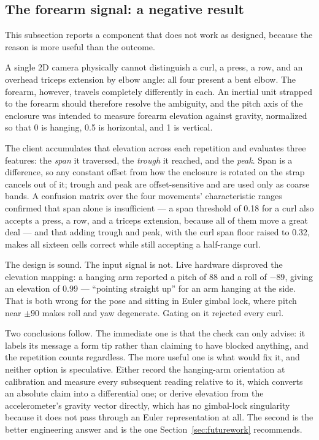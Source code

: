 \documentclass[11pt,a4paper]{article}
\begin{document}
\subsection{The forearm signal: a negative result}
\label{sec:forearm}

This subsection reports a component that does not work as designed, because the
reason is more useful than the outcome.

A single 2D camera physically cannot distinguish a curl, a press, a row, and an
overhead triceps extension by elbow angle: all four present a bent elbow. The
forearm, however, travels completely differently in each. An inertial unit
strapped to the forearm should therefore resolve the ambiguity, and the pitch
axis of the enclosure was intended to measure forearm elevation against gravity,
normalized so that 0 is hanging, 0.5 is horizontal, and 1 is vertical.

The client accumulates that elevation across each repetition and evaluates three
features: the \emph{span} it traversed, the \emph{trough} it reached, and the
\emph{peak}. Span is a difference, so any constant offset from how the enclosure
is rotated on the strap cancels out of it; trough and peak are offset-sensitive
and are used only as coarse bands. A confusion matrix over the four movements'
characteristic ranges confirmed that span alone is insufficient --- a span
threshold of 0.18 for a curl also accepts a press, a row, and a triceps
extension, because all of them move a great deal --- and that adding trough and
peak, with the curl span floor raised to 0.32, makes all sixteen cells correct
while still accepting a half-range curl.

The design is sound. The input signal is not. Live hardware disproved the
elevation mapping: a hanging arm reported a pitch of 88\textdegree{} and a roll
of $-89$\textdegree, giving an elevation of 0.99 --- ``pointing straight up'' for
an arm hanging at the side. That is both wrong for the pose and sitting in Euler
gimbal lock, where pitch near $\pm90$\textdegree{} makes roll and yaw degenerate.
Gating on it rejected every curl.

Two conclusions follow. The immediate one is that the check can only advise: it
labels its message a form tip rather than claiming to have blocked anything, and
the repetition counts regardless. The more useful one is what would fix it, and
neither option is speculative. Either record the hanging-arm orientation at
calibration and measure every subsequent reading relative to it, which converts
an absolute claim into a differential one; or derive elevation from the
accelerometer's gravity vector directly, which has no gimbal-lock singularity
because it does not pass through an Euler representation at all. The second is
the better engineering answer and is the one Section~\ref{sec:futurework}
recommends.
\end{document}

